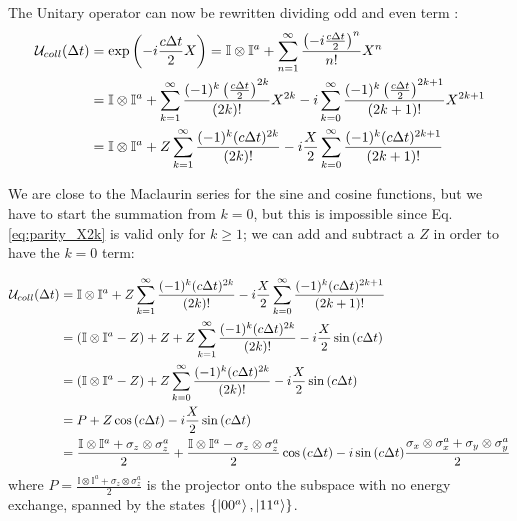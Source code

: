 \documentclass[a4paper,12pt]{article}
\begin{document}
The Unitary operator can now be rewritten dividing odd and even term : 
\begin{align}
	\mathcal{U}_{coll}(\Delta t) &= \exp{\left( -i \frac{c \Delta t}{2} X \right)} = \mathbb{I} \otimes \mathbb{I}^{a} + \sum_{n=1}^{\infty} \frac{\left( -i \frac{c \Delta t}{2} \right)^n}{n!} X^n \notag \\
	&= \mathbb{I} \otimes \mathbb{I}^{a} + \sum_{k=1}^{\infty} \frac{(-1)^k \left( \frac{c \Delta t}{2} \right)^{2k}}{(2k)!} X^{2k} - i \sum_{k=0}^{\infty} \frac{(-1)^k \left( \frac{c \Delta t}{2} \right)^{2k+1}}{(2k+1)!} X^{2k+1} \notag \\
	&= \mathbb{I} \otimes \mathbb{I}^{a} + Z \sum_{k=1}^{\infty} \frac{(-1)^k (c \Delta t)^{2k}}{(2k)!} - i \frac{X}{2} \sum_{k=0}^{\infty} \frac{(-1)^k (c \Delta t)^{2k+1}}{(2k+1)!}
\end{align}

We are close to the  Maclaurin series for the sine and cosine functions, but we have to start the summation from $ k = 0 $, but this is impossible since Eq.\ref{eq:parity_X2k} is valid only for $ k \geq 1 $; we can add and subtract a $ Z $ in order to have the $ k=0 $ term: 

\begin{align}
	\mathcal{U}_{coll}(\Delta t) &= \mathbb{I} \otimes \mathbb{I}^{a} + Z \sum_{k=1}^{\infty} \frac{(-1)^k (c \Delta t)^{2k}}{(2k)!} - i \frac{X}{2} \sum_{k=0}^{\infty} \frac{(-1)^k (c \Delta t)^{2k+1}}{(2k+1)!} \notag \\
	&= \left( \mathbb{I} \otimes \mathbb{I}^{a} - Z \right) + Z + Z \sum_{k=1}^{\infty} \frac{(-1)^k (c \Delta t)^{2k}}{(2k)!} - i \frac{X}{2} \sin{(c \Delta t)} \notag \\
	&= \left( \mathbb{I} \otimes \mathbb{I}^{a} - Z \right) + Z \sum_{k=0}^{\infty} \frac{(-1)^k (c \Delta t)^{2k}}{(2k)!} - i \frac{X}{2} \sin{(c \Delta t)} \notag \\
	&= P + Z \cos{(c \Delta t)} - i \frac{X}{2} \sin{(c \Delta t)} \notag \\
	&= \frac{\mathbb{I} \otimes \mathbb{I}^{a} + \sigma_{z} \otimes  \sigma_{z}^{a}}{2} + \frac{\mathbb{I} \otimes \mathbb{I}^{a} - \sigma_{z} \otimes \sigma_{z}^{a}}{2} \cos{(c \Delta t)} - i \sin{(c \Delta t)} \frac{\sigma_{x} \otimes \sigma_{x}^{a} + \sigma_{y} \otimes \sigma_{y}^{a}}{2} \notag \\
	\label{eq:U_Coll_exact}
\end{align}
where $ P = \frac{\mathbb{I} \otimes \mathbb{I}^{a} + \sigma_{z} \otimes \sigma_{z}^{a}}{2} $ is the projector onto the subspace with no energy exchange, spanned by the states $ \{ \ket{00^{a}}, \ket{11^{a}} \} $.
\end{document}

